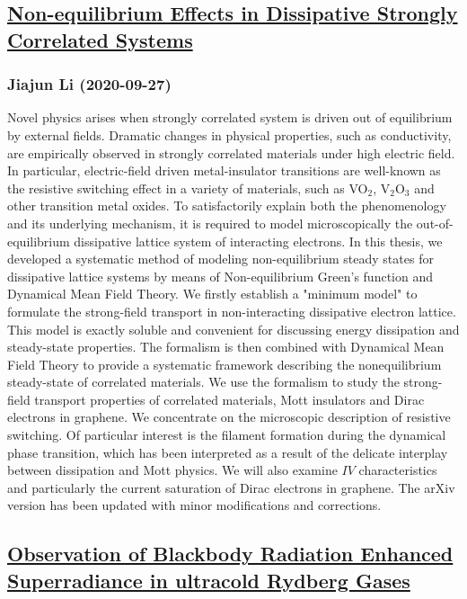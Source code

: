 \subsection*{\href{http://arxiv.org/abs/2009.12865v1}{Non-equilibrium Effects in Dissipative Strongly Correlated Systems}}
\subsubsection*{Jiajun Li (2020-09-27)}
Novel physics arises when strongly correlated system is driven out of
equilibrium by external fields. Dramatic changes in physical properties, such
as conductivity, are empirically observed in strongly correlated materials
under high electric field. In particular, electric-field driven metal-insulator
transitions are well-known as the resistive switching effect in a variety of
materials, such as VO$_2$, V$_2$O$_3$ and other transition metal oxides. To
satisfactorily explain both the phenomenology and its underlying mechanism, it
is required to model microscopically the out-of-equilibrium dissipative lattice
system of interacting electrons. In this thesis, we developed a systematic
method of modeling non-equilibrium steady states for dissipative lattice
systems by means of Non-equilibrium Green's function and Dynamical Mean Field
Theory. We firstly establish a "minimum model" to formulate the strong-field
transport in non-interacting dissipative electron lattice. This model is
exactly soluble and convenient for discussing energy dissipation and
steady-state properties. The formalism is then combined with Dynamical Mean
Field Theory to provide a systematic framework describing the nonequilibrium
steady-state of correlated materials. We use the formalism to study the
strong-field transport properties of correlated materials, Mott insulators and
Dirac electrons in graphene. We concentrate on the microscopic description of
resistive switching. Of particular interest is the filament formation during
the dynamical phase transition, which has been interpreted as a result of the
delicate interplay between dissipation and Mott physics. We will also examine
$IV$ characteristics and particularly the current saturation of Dirac electrons
in graphene. The arXiv version has been updated with minor modifications and
corrections.

\subsection*{\href{http://arxiv.org/abs/2009.12860v1}{Observation of Blackbody Radiation Enhanced Superradiance in ultracold  Rydberg Gases}}
